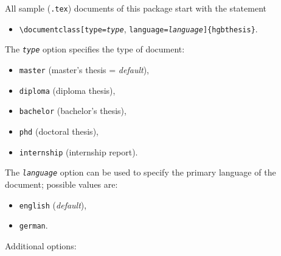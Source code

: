 All sample (\verb!.tex!) documents of this package start with the statement
%
\begin{itemize}
    \item[] \verb!\documentclass[!\texttt{type=\emph{type}},%
    \texttt{language=\emph{language}}\verb!]{hgbthesis}!.
\end{itemize}
%
The \texttt{\emph{type}} option specifies the type of document:
%
\begin{itemize}
    \item[] \texttt{master} (master's thesis = \emph{default}),
    \item[] \texttt{diploma} (diploma thesis),
    \item[] \texttt{bachelor} (bachelor's thesis),
    \item[] \texttt{phd} (doctoral thesis),
    \item[] \texttt{internship} (internship report).
\end{itemize}
%
The \texttt{\emph{language}} option can be used to specify the primary language
of the document; possible values are:
%
\begin{itemize}
    \item[] \texttt{english} (\emph{default}),
    \item[] \texttt{german}.
\end{itemize}
%
Additional options:
%
